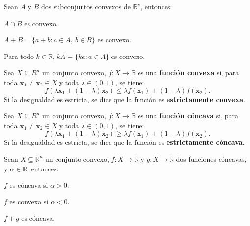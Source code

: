 \documentclass[8pt,a4paper]{extarticle}
\begin{document}
\begin{multicols}{3}
\begin{boxprop}
	Sean $A$ y $B$ dos subconjuntos convexos de $\mathbb{R}^n$, entonces:
	\begin{eqlist}
	\item $A \cap B$ es convexo.
	\item $A + B = \{a + b : a \in A,\ b \in B\}$ es convexo.
	\item Para todo $k \in \mathbb{R}$, $kA = \{ka : a\in A\}$ es convexo.
	\end{eqlist}
\end{boxprop}

\begin{boxdef}
	Sea $X \subseteq R^n$ un conjunto convexo, $f : X \to \mathbb{R}$ es una \textbf{función convexa} si, para toda $\mathbf{x}_1 \neq \mathbf{x}_2 \in X$ y toda $\lambda \in (0, 1)$, se tiene:
	\[
		f(\lambda \mathbf{x}_1 + (1 - \lambda)\mathbf{x}_2) \le \lambda f(\mathbf{x}_1) + (1 - \lambda) f(\mathbf{x}_2)
	.\] 
	Si la desigualdad es estricta, se dice que la función es \textbf{estrictamente convexa}.
\end{boxdef}

\begin{boxdef}                                                                                         
    Sea $X \subseteq R^n$ un conjunto convexo, $f : X \to \mathbb{R}$ es una \textbf{función cóncava} si, para toda $\mathbf{x}_1 \neq \mathbf{x}_2 \in X$ y toda $\lambda \in (0, 1)$, se tiene:
    \[                                                                                                                  
        f(\lambda \mathbf{x}_1 + (1 - \lambda)\mathbf{x}_2) \ge \lambda f(\mathbf{x}_1) + (1 - \lambda) f(\mathbf{x}_2)                                     
    .\]                                                                                                                 
    Si la desigualdad es estricta, se dice que la función es \textbf{estrictamente cóncava}.                            
\end{boxdef}

\begin{boxprop}
	Sean $X \subseteq \mathbb{R}^n$ un conjunto convexo, $f : X \to \mathbb{R}$ y $g : X \to \mathbb{R}$ dos funciones cóncavas, y $\alpha \in \mathbb{R}$, entonces:
	\begin{eqlist}
	\item $f$ es cóncava si $\alpha > 0$.
	\item $f$ es convexa si $\alpha < 0$.
	\item $f+g$ es cóncava.
	\end{eqlist}
\end{boxprop}


\end{multicols}
\end{document}
